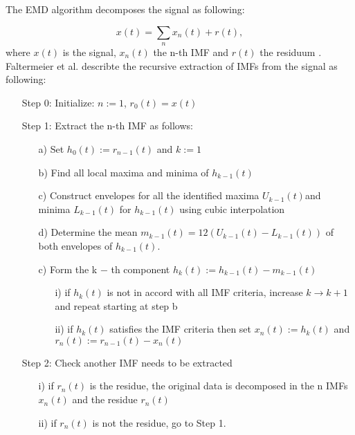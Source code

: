 The EMD algorithm decomposes the signal as following:

\begin{equation}
    x(t) = \sum_{n} x_{n}(t) + r(t),
\end{equation}
where $x(t)$ is the signal, $x_{n}(t)$ the n-th IMF and $r(t)$ the residuum \cite{Faltermeier2010}. Faltermeier et al. \cite{Faltermeier2010} describte the recursive extraction of IMFs from the signal as following: 
\begin{itemize}
    \item [Step 0:] Initialize: $n := 1$, $r_{0}(t) = x(t)$
    \item [Step 1:] Extract the n-th IMF as follows:
    \begin{itemize}
         \item [a)] Set $h_{0}(t) := r_{n−1}(t)$ and $k := 1$
         \item [b)] Find all local maxima and minima of $h_{k−1}(t)$
         \item [c)] Construct envelopes for all the identified maxima $U_{k−1}(t)$and minima $L_{k−1}(t)$ for $h_{k−1}(t)$ using cubic interpolation
         \item [d)] Determine the mean $m_{k−1}(t) = 12 (U_{k−1}(t) - L_{k−1}(t))$ of both envelopes of $h_{k−1}(t)$.
         \item [c)] Form the k − th component $h_{k}(t) := h_{k−1}(t) - m_{k−1}(t)$
         \begin{itemize}
            \item [i)] if $h_{k}(t)$ is not in accord with all IMF criteria, increase $k \rightarrow k + 1$ and repeat starting at step b
            \item [ii)] if $h_{k}(t)$ satisfies the IMF criteria then set $x_{n}(t) := h_{k}(t)$ and $r_{n}(t) := r_{n-1}(t) − x_{n}(t)$
         \end{itemize}
    \end{itemize}
    \item [Step 2:] Check another IMF needs to be extracted
        \begin{itemize}
            \item [i)] if $r_{n}(t)$ is the residue, the original data is decomposed in the n IMFs  $x_{n}(t)$ and the residue $r_{n}(t)$
            \item [ii)] if $r_{n}(t)$ is not the residue, go to Step 1.
         \end{itemize}
\end{itemize}


